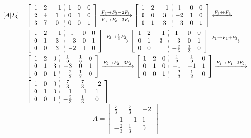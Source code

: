 $ \begin{aligned}
	[A|I_3]=&\left[\begin{array}{ccc:ccc}
		1 & 2 & -1 & 1 & 0 & 0 \\
		2 & 4 & 1 & 0 & 1 & 0 \\
		3 & 7 & 0 & 0 & 0 & 1
	\end{array}\right]\xrightarrow[F_3\to F_3-3F_1]{F_2\to F_2-2F_1} \left[\begin{array}{ccc:ccc}
		1 & 2 & -1 & 1 & 0 & 0 \\
		0 & 0 & 3 & -2 & 1 & 0 \\
		0 & 1 & 3 & -3 & 0 & 1
	\end{array}\right]\xleftrightarrow{F_2\leftrightarrow F_3}\\
	&\left[\begin{array}{ccc:ccc}
		1 & 2 & -1 & 1 & 0 & 0 \\
		0 & 1 & 3 & -3 & 0 & 1 \\
		0 & 0 & 3 & -2 & 1 & 0
	\end{array}\right]\xrightarrow{F_3\to\frac{1}{3}F_3}\left[\begin{array}{ccc:ccc}
		1 & 2 & -1 & 1 & 0 & 0 \\
		0 & 1 & 3 & -3 & 0 & 1 \\
		0 & 0 & 1 & -\frac{2}{3} & \frac{1}{3} & 0
	\end{array}\right]\xrightarrow{F_1\to F_1+F_3}\\
	&\left[\begin{array}{ccc:ccc}
	1 & 2 & 0 & \frac{1}{3} & \frac{1}{3} & 0 \\ 
	0 & 1 & 3 & -3 & 0 & 1 \\ 
	0 & 0 & 1 & -\frac{2}{3} & \frac{1}{3} & 0
	\end{array} \right]\xrightarrow{F_2\to F_2-3F_3}\left[\begin{array}{ccc:ccc}
	1 & 2 & 0 & \frac{1}{3} & \frac{1}{3} & 0 \\ 
	0 & 1 & 0 & -1 & -1 & 1 \\ 
	0 & 0 & 1 & -\frac{2}{3} & \frac{1}{3} & 0
	\end{array} \right]\xrightarrow{F_1\to F_1-2F_2}\\
	& \left[\begin{array}{ccc:ccc}
	1 & 0 & 0 & \frac{7}{3} & \frac{7}{3} & -2 \\ 
	0 & 1 & 0 & -1 & -1 & 1 \\ 
	0 & 0 & 1 & -\frac{2}{3} & \frac{1}{3} & 0
	\end{array} \right]
\end{aligned} $
\[ A=\left[\begin{array}{ccc}
\frac{7}{3} & \frac{7}{3} & -2 \\ 
-1 & -1 & 1 \\ 
-\frac{2}{3} & \frac{1}{3} & 0
\end{array} \right] \]
